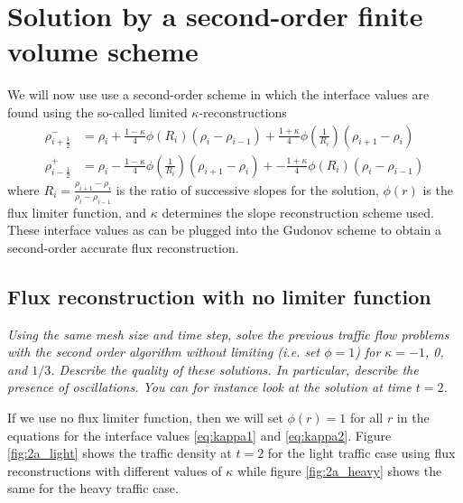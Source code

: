 \documentclass[11pt]{article}
\begin{document}
\section{Solution by a second-order finite volume scheme}
We will now use use a second-order scheme in which the interface values are found using the so-called limited $\kappa$-reconstructions
\begin{align}
  \rho_{i+\frac{1}{2}}^- &= \rho_i
    + \frac{1-\kappa}{4} \phi(R_i) (\rho_i - \rho_{i-1})
    + \frac{1+\kappa}{4} \phi\left(\frac{1}{R_i}\right)(\rho_{i+1} - \rho_i) \label{eq:kappa1} \\
  \rho_{i-\frac{1}{2}}^+ &= \rho_i
    - \frac{1-\kappa}{4} \phi\left(\frac{1}{R_i}\right) (\rho_{i+1} - \rho_i)
    +- \frac{1+\kappa}{4} \phi(R_i) (\rho_i - \rho_{i-1}) \label{eq:kappa2}
\end{align}
where $\displaystyle R_i = \frac{\rho_{i+1} - \rho_i}{\rho_i - \rho_{i-1}}$ is the ratio of successive slopes for the solution, $\phi(r)$ is the flux limiter function, and $\kappa$ determines the slope reconstruction scheme used. These interface values as can be plugged into the Gudonov scheme to obtain a second-order accurate flux reconstruction.

\subsection{Flux reconstruction with no limiter function}
\begin{tcolorbox}
  \textit{Using the same mesh size and time step, solve the previous traffic flow problems with the second order algorithm without limiting (i.e. set $\phi = 1$) for $\kappa = -1$, 0, and $1/3$. Describe the quality of these solutions. In particular, describe the presence of oscillations. You can for instance look at the solution at time $t = 2$.}
\end{tcolorbox}

If we use no flux limiter function, then we will set $\phi(r) = 1$ for all $r$ in the equations for the interface values \eqref{eq:kappa1} and \eqref{eq:kappa2}. Figure \ref{fig:2a_light} shows the traffic density at $t=2$ for the light traffic case using flux reconstructions with different values of $\kappa$ while figure \ref{fig:2a_heavy} shows the same for the heavy traffic case.
\end{document}
